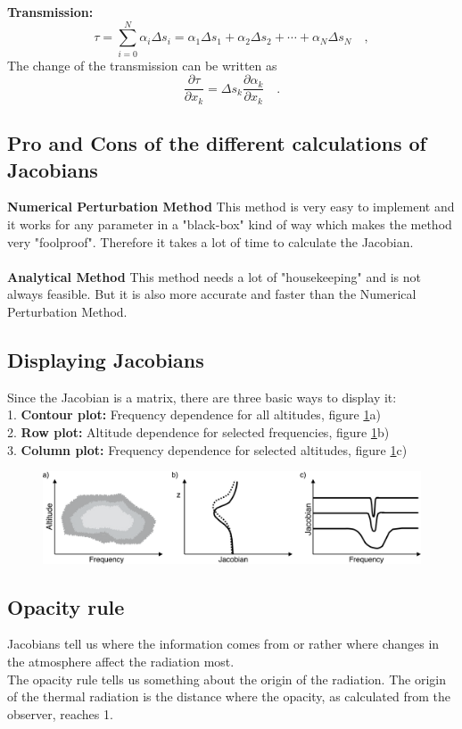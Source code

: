 \textbf{Transmission:}
\begin{equation}
\tau=\sum_{i=0}^N \alpha_i \Delta s_i = \alpha_1 \Delta s_1 + \alpha_2 \Delta
s_2 + \cdots + \alpha_N \Delta s_N \quad ,
\end{equation}
The change of the transmission can be written as
\begin{equation*}
\frac{\partial \tau}{\partial x_k}=\Delta s_k \frac{\partial \alpha_k}{\partial
	x_k} \quad .
\end{equation*}

\subsection*{Pro and Cons of the different calculations of Jacobians}
\textbf{Numerical Perturbation Method}
This method is very easy to implement and it works for any parameter in a
"black-box" kind of way which makes the method very "foolproof". Therefore it
takes a lot of time to calculate the Jacobian.
\\\\
\textbf{Analytical Method}
This method needs a lot of "housekeeping" and is not always feasible. But it is
also more accurate and faster than the Numerical Perturbation Method.

\subsection*{Displaying Jacobians}
Since the Jacobian is a matrix, there are three basic ways to display it:\\
1. \textbf{Contour plot:} Frequency dependence for all altitudes, figure
\ref{fig:plotTypes}a)\\
2. \textbf{Row plot:} Altitude dependence for selected frequencies, figure
\ref{fig:plotTypes}b)\\
3. \textbf{Column plot:} Frequency dependence for selected altitudes, figure
\ref{fig:plotTypes}c)

\begin{figure}
	\centering
	\includegraphics[width=\textwidth]{./figures/plotTypes_Jacobian}
	\caption{}
	\label{fig:plotTypes}
\end{figure}

\subsection*{Opacity rule}
Jacobians tell us where the information comes from or rather where changes in
the atmosphere affect the radiation most.\\
The opacity rule tells us something about the origin of the radiation. The
origin of the thermal radiation is the distance where the opacity, as calculated
from the observer, reaches 1.


